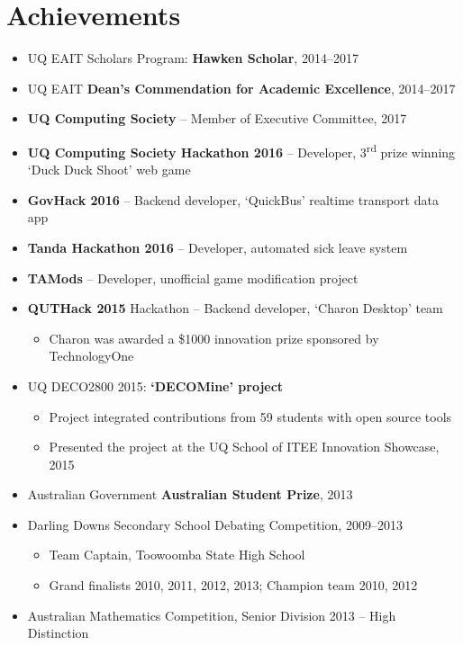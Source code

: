 \documentclass[11pt,a4paper,sans]{moderncv}        %
\begin{document}
\section{Achievements}
\begin{minipage}{\maincolumnwidth}\small
	\begin{itemize}
		\item UQ EAIT Scholars Program: \textbf{Hawken Scholar}, 2014--2017
		\item UQ EAIT \textbf{Dean's Commendation for Academic Excellence}, 2014--2017
		\item \textbf{UQ Computing Society} -- Member of Executive Committee, 2017
		\item \textbf{UQ Computing Society Hackathon 2016} -- Developer, 3\textsuperscript{rd} prize winning `Duck Duck Shoot' web game
		\item \textbf{GovHack 2016} -- Backend developer, `QuickBus' realtime transport data app
		\item \textbf{Tanda Hackathon 2016} -- Developer, automated sick leave system
		\item \textbf{TAMods} -- Developer, unofficial game modification project
		\item \textbf{QUTHack 2015} Hackathon -- Backend developer, `Charon Desktop' team
		\begin{itemize}
			\item Charon was awarded a \$1000 innovation prize sponsored by TechnologyOne
		\end{itemize}
		\item UQ DECO2800 2015: \textbf{`DECOMine' project}
		\begin{itemize}
			\item Project integrated contributions from 59 students with open source tools
			\item Presented the project at the UQ School of ITEE Innovation Showcase, 2015
		\end{itemize}
		\item Australian Government \textbf{Australian Student Prize}, 2013
		\item Darling Downs Secondary School Debating Competition, 2009--2013
		\begin{itemize}
			\item Team Captain, Toowoomba State High School
			\item Grand finalists 2010, 2011, 2012, 2013; Champion team 2010, 2012
		\end{itemize}
		\item Australian Mathematics Competition, Senior Division 2013 -- High Distinction
	\end{itemize}
\end{minipage}
\end{document}
